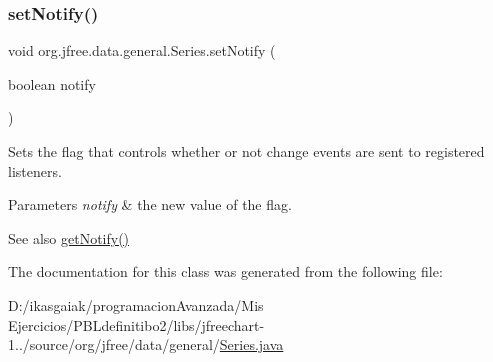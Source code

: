 \subsubsection{\texorpdfstring{set\+Notify()}{setNotify()}}
{\footnotesize\ttfamily void org.\+jfree.\+data.\+general.\+Series.\+set\+Notify (\begin{DoxyParamCaption}\item[{boolean}]{notify }\end{DoxyParamCaption})}

Sets the flag that controls whether or not change events are sent to registered listeners.


\begin{DoxyParams}{Parameters}
{\em notify} & the new value of the flag.\\
\hline
\end{DoxyParams}
\begin{DoxySeeAlso}{See also}
\mbox{\hyperlink{classorg_1_1jfree_1_1data_1_1general_1_1_series_a9a5482d882214bd5a1be9690b77fbd39}{get\+Notify()}} 
\end{DoxySeeAlso}


The documentation for this class was generated from the following file\+:\begin{DoxyCompactItemize}
\item 
D\+:/ikasgaiak/programacion\+Avanzada/\+Mis Ejercicios/\+P\+B\+Ldefinitibo2/libs/jfreechart-\/1../source/org/jfree/data/general/\mbox{\hyperlink{_series_8java}{Series.\+java}}\end{DoxyCompactItemize}
